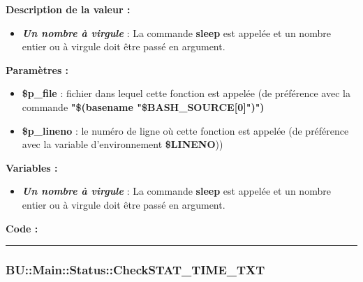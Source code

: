 \documentclass[a4paper,10pt]{article}
\begin{document}
\begin{justify}
    \textbf{Description de la valeur :}

    \begin{itemize}
        \item \textbf{\textit{Un nombre à virgule}} : La commande \textbf{\color{gray}sleep} est appelée et un nombre entier ou à virgule doit être passé en argument.
    \end{itemize}

\end{justify}

\begin{justify}
    \textbf{Paramètres :}

    \begin{itemize}
        \item \color{orange}\textbf{\$p\_file}\color{white} : fichier dans lequel cette fonction est appelée (de préférence avec la commande \textbf{"\$(\color{gray}basename \color{white}"\color{orange}\$BASH\_SOURCE[0]\color{white}")")}\\

        \item \color{orange}\textbf{\$p\_lineno}\color{white} : le numéro de ligne où cette fonction est appelée (de préférence avec la variable d'environnement \textbf{\color{orange}\$LINENO}))
    \end{itemize}
\end{justify}

\begin{justify}
    \textbf{Variables :}

    \begin{itemize}
        \item \textbf{\textit{Un nombre à virgule}} : La commande \textbf{\color{gray}sleep} est appelée et un nombre entier ou à virgule doit être passé en argument.
    \end{itemize}
\end{justify}

\begin{justify}
    \textbf{Code :}
\end{justify}



\color{blue}\par\noindent\rule{\textwidth}{0.4pt}\color{white}

\color{blue}
\subsubsection{\color{mauve}BU::Main::Status::CheckSTAT\_TIME\_TXT}\color{white}
\end{document}
